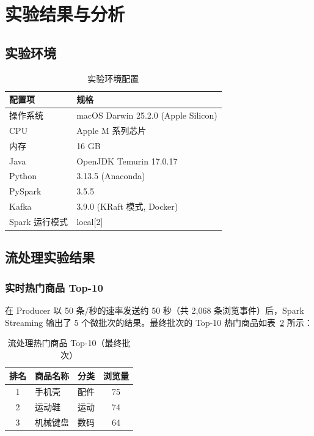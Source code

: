 \documentclass[12pt,a4paper]{article}
\begin{document}
\section{实验结果与分析}

\subsection{实验环境}

\begin{table}[H]
\centering
\caption{实验环境配置}
\label{tab:env}
\begin{tabular}{ll}
\toprule
\textbf{配置项} & \textbf{规格} \\
\midrule
操作系统 & macOS Darwin 25.2.0 (Apple Silicon) \\
CPU & Apple M 系列芯片 \\
内存 & 16 GB \\
Java & OpenJDK Temurin 17.0.17 \\
Python & 3.13.5 (Anaconda) \\
PySpark & 3.5.5 \\
Kafka & 3.9.0 (KRaft 模式, Docker) \\
Spark 运行模式 & local[2] \\
\bottomrule
\end{tabular}
\end{table}

\subsection{流处理实验结果}

\subsubsection{实时热门商品 Top-10}

在 Producer 以 50 条/秒的速率发送约 50 秒（共 2,068 条浏览事件）后，Spark Streaming 输出了 5 个微批次的结果。最终批次的 Top-10 热门商品如表~\ref{tab:hot-products} 所示：

\begin{table}[H]
\centering
\caption{流处理热门商品 Top-10（最终批次）}
\label{tab:hot-products}
\begin{tabular}{clcc}
\toprule
\textbf{排名} & \textbf{商品名称} & \textbf{分类} & \textbf{浏览量} \\
\midrule
1 & 手机壳 & 配件 & 75 \\
2 & 运动鞋 & 运动 & 74 \\
3 & 机械键盘 & 数码 & 64 \\
\bottomrule
\end{tabular}
\end{table}
\end{document}

